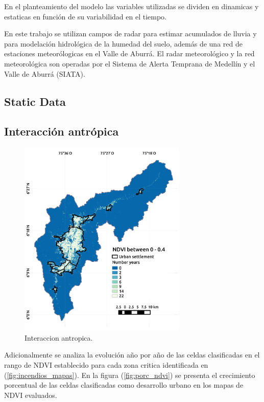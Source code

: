 En el planteamiento del modelo las variables utilizadas se dividen en dinamicas y estaticas en función de su variabilidad en el tiempo.

En este trabajo se utilizan campos de radar para estimar acumulados de lluvia y para  modelación hidrológica de la humedad del suelo, además de una red de estaciones meteorólogicas en el Valle de Aburrá. El radar meteorológico y la red meteorológica son operadas por el Sistema de Alerta Temprana de Medellín y el Valle de Aburrá (SIATA).



\subsection{Static Data}

\subsection*{Interacción antrópica}




\begin{figure}[h]
\centering
\includegraphics[trim={0.2cm 0cm 0.2cm 0cm},clip,width=8.0cm]{Figuras/evol_ndvi.pdf}
\caption{Interaccion antropica.}
\label{fig:evol_ndvi}
\end{figure}

Adicionalmente se analiza la evolución año por año de las celdas clasificadas en el rango de NDVI establecido para cada zona critica identificada en (\ref{fig:incendios_mapas}). En la figura (\ref{fig:porc_ndvi}) se presenta el crecimiento porcentual de las celdas clasificadas como desarrollo urbano en los mapas de NDVI evaluados.

